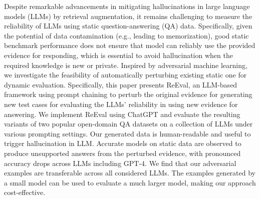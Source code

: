 Despite remarkable advancements in mitigating hallucinations in large language models (LLMs) by retrieval augmentation, it remains challenging to measure the reliability of LLMs using static question-answering (QA) data. Specifically, given the potential of data contamination (e.g., leading to memorization), good static benchmark performance does not ensure that model can reliably use the provided evidence for responding, which is essential to avoid hallucination when the required knowledge is new or private. Inspired by adversarial machine learning, we investigate the feasibility of automatically perturbing existing static one for dynamic evaluation. Specifically, this paper presents ReEval, an LLM-based framework using prompt chaining to perturb the original evidence for generating new test cases for evaluating the LLMs’ reliability in using new evidence for answering. We implement ReEval using ChatGPT and evaluate the resulting variants of two popular open-domain QA datasets on a collection of LLMs under various prompting settings. Our generated data is human-readable and useful to trigger hallucination in LLM. Accurate models on static data are observed to produce unsupported answers from the perturbed evidence, with pronounced accuracy drops across LLMs including GPT-4. We find that our adversarial examples are transferable across all considered LLMs. The examples generated by a small model can be used to evaluate a much larger model, making our approach cost-effective.